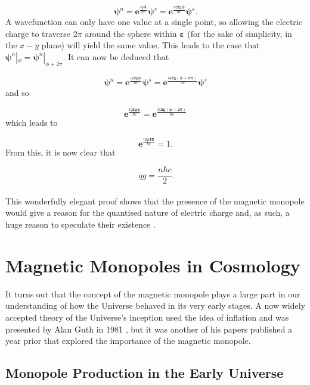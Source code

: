 \documentclass[twocolumn, 10pt]{article}
\begin{document}
\begin{equation}
\bm{\psi}^n = \bm{e}^\frac{iq\bm{\Lambda}}{\hbar c}\bm{\psi}^s = \bm{e}^\frac{iq\bm{2g\phi}}{\hbar c}\bm{\psi}^s.
\end{equation}
A wavefunction can only have one value at a single point, so allowing the electric charge to traverse $2\pi$ around the sphere within $\bm{\varepsilon}$ (for the sake of simplicity, in the $x-y$ plane) will yield the same value. This leads to the case that $\bm{\psi}^n|_\phi = \bm{\psi}^n|_{\phi+2\pi}$. It can now be deduced that 

\begin{equation}
\bm{\psi}^n = \bm{e}^\frac{iq\bm{2g\phi}}{\hbar c}\bm{\psi}^s = \bm{e}^\frac{iq\bm{2g(\phi+2\pi)}}{\hbar c}\bm{\psi}^s
\end{equation}
and so

\begin{equation}
\bm{e}^\frac{iq\bm{2g\phi}}{\hbar c} = \bm{e}^\frac{iq\bm{2g(\phi+2\pi)}}{\hbar c}
\end{equation}
which leads to

\begin{equation}
\bm{e}^\frac{iq\bm{g4\pi}}{\hbar c} = 1.
\end{equation}
From this, it is now clear that 

\begin{equation}\
qg = \frac{n\hbar c}{2}.
\end{equation}
\\
\indent This wonderfully elegant proof shows that the presence of the magnetic monopole would give a reason for the quantised nature of electric charge and, as such, a huge reason to speculate their existence \cite{Heras_2018, shnir, preskill1984magnetic}.

\section{Magnetic Monopoles in Cosmology}
It turns out that the concept of the magnetic monopole plays a large part in our understanding of how the Universe behaved in its very early stages. A now widely accepted theory of the Universe's inception used the idea of inflation and was presented by Alan Guth in 1981 \cite{liddle2015cosmo, guth1981inflate}, but it was another of his papers published a year prior that explored the importance of the magnetic monopole.

\subsection{Monopole Production in the Early Universe}
\end{document}
